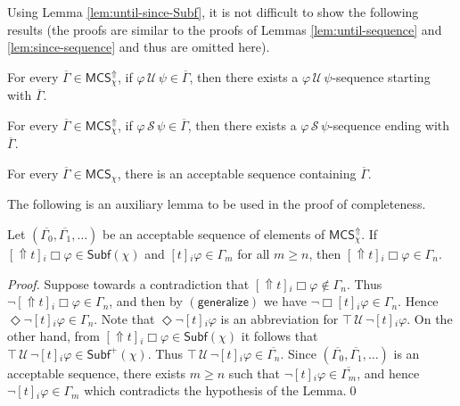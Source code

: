 \documentclass[envcountsect,envcountsame,oribibl,orivec]{llncs}
\newcommand{\lalways}{\Box}
\newcommand{\leventually}{\Diamond}
\newcommand{\luntil}{{\,\mathcal{U}\,}}
\newcommand{\lsince}{{\,\mathcal{S}\,}}
\newcommand{\jbox}[1]{\left[#1\right]\!}
\newcommand{\tgeneralize}{\Uparrow}
\newcommand{\generalizeprinciple}{\ensuremath{(\textsf{generalize})}}
\renewcommand{\phi}{\varphi}
\newcommand{\Subf}{\mathsf{Subf}}
\newcommand{\MCS}{\mathsf{MCS}}
\begin{document}
Using Lemma \ref{lem:until-since-Subf}, it is not difficult to show the following results (the proofs are similar to the proofs of Lemmas \ref{lem:until-sequence} and  \ref{lem:since-sequence} and thus are omitted here).

\begin{lemma}\label{lem:until-sequence for generalize}
	For every $\overline{\Gamma} \in \MCS_\chi^\tgeneralize$, if $\phi \luntil \psi \in \overline{\Gamma}$, then there exists a  $\phi \luntil \psi$-sequence starting with $\overline{\Gamma}$.
\end{lemma}


\begin{lemma}\label{lem:since-sequence for generalize}
	For every $\overline{\Gamma} \in \MCS_\chi^\tgeneralize$, if $\phi \lsince \psi \in \overline{\Gamma}$, then there exists a  $\phi \lsince \psi$-sequence ending with $\overline{\Gamma}$.
\end{lemma}


\begin{corollary}
	For every $\overline{\Gamma} \in \MCS_\chi$, there is an acceptable sequence containing $\overline{\Gamma}$. 
\end{corollary}

The following is an auxiliary lemma to be used in the proof of completeness.

\begin{lemma}\label{lem:evidence generalize condition}
Let $(\overline{\Gamma_0}, \overline{\Gamma_1}, \ldots)$ be an acceptable sequence of elements of $\MCS_\chi^\tgeneralize$. If $\jbox{\tgeneralize t}_i \lalways \phi \in \Subf(\chi)$ and $\jbox{t}_i \phi \in \Gamma_m$ for all $m \geq n$, then $ \jbox{\tgeneralize t}_i \lalways \phi \in \Gamma_n$.
\end{lemma}
\begin{proof}
Suppose towards a contradiction that $ \jbox{\tgeneralize t}_i \lalways \phi \not\in \Gamma_n$. Thus $\neg \jbox{\tgeneralize t}_i \lalways \phi \in \Gamma_n$, and then by $\generalizeprinciple$ we have $\neg \lalways \jbox{t}_i \phi \in \Gamma_n$. Hence $\leventually \neg \jbox{t}_i \phi \in \Gamma_n$. Note that $\leventually \neg \jbox{t}_i \phi$ is an abbreviation for $\top \luntil \neg \jbox{t}_i \phi$. On the other hand, from $\jbox{\tgeneralize t}_i \lalways \phi \in \Subf(\chi)$ it follows that $\top \luntil \neg \jbox{t}_i \phi \in \Subf^+ (\chi)$. Thus  $\top \luntil \neg \jbox{t}_i \phi \in \overline{\Gamma_n}$. Since $(\overline{\Gamma_0}, \overline{\Gamma_1}, \ldots)$ is an acceptable sequence, there exists $m \geq n$ such that $\neg \jbox{t}_i \phi \in \overline{\Gamma_m}$, and hence $\neg \jbox{t}_i \phi \in \Gamma_m$ which contradicts the hypothesis of the Lemma.\qed
\end{proof}
\end{document}
